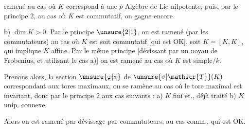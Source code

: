 
ramené au cas où $K$ correspond à une $p$-Algèbre de Lie nilpotente, puis, par le principe $2$, au cas où $K$ est commutatif, on gagne encore

b) $\dim K>0$. Par le principe $\unsure{2|1}$,  on est ramené (par les commutateurs) au cas où $K$ est soit commutatif [qui est OK], soit $K=[K,K]$, qui implique $K$ affine.  Par le même principe [dévissant par un noyau de Frobenius, et utilisant le cas a)] on est ramené au cas où $K$ est simple$/k$.


Prenons alors, la section $\unsure{\varphi|\phi}$ de $\unsure{\sigma|\mathscr{T}}(K)$ correspondant aux tores maximaux, on  se ramène  au cas où le tore maximal est  invariant, donc par le principe $2$ aux    cas suivants : a) $K$ fini ét., déjà traité b) $K$  unip. connexe.

 Alors on est ramené par dévissage par commutateurs, au cas comm., qui est OK.


